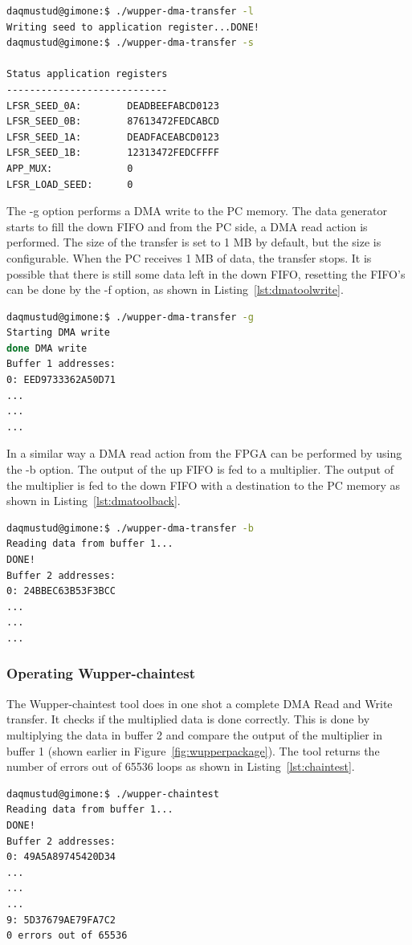 \begin{lstlisting}[language=BASH, frame=single, label={lst:dmatoolseed}, caption=Loading a pre-programmed seed in to the data generator.]
daqmustud@gimone:$ ./wupper-dma-transfer -l
Writing seed to application register...DONE! 
daqmustud@gimone:$ ./wupper-dma-transfer -s

Status application registers
----------------------------
LFSR_SEED_0A:        DEADBEEFABCD0123 
LFSR_SEED_0B:        87613472FEDCABCD 
LFSR_SEED_1A:        DEADFACEABCD0123 
LFSR_SEED_1B:        12313472FEDCFFFF 
APP_MUX:             0 
LFSR_LOAD_SEED:      0
\end{lstlisting}


The -g option performs a DMA write to the PC memory. The data generator starts to fill the down FIFO and from the PC side, a DMA read action is performed. The size of the transfer is set to 1 MB by default, but the size is configurable. When the PC receives 1 MB of data, the transfer stops. It is possible that there is still some data left in the down FIFO, resetting the FIFO's can be done by the -f option, as shown in Listing~\ref{lst:dmatoolwrite}.

\begin{lstlisting}[language=BASH, frame=single, label={lst:dmatoolwrite}, caption=Start generating data to the target.]
daqmustud@gimone:$ ./wupper-dma-transfer -g
Starting DMA write
done DMA write 
Buffer 1 addresses:
0: EED9733362A50D71 
...
...
...
\end{lstlisting}

\newpage

In a similar way a DMA read action from the FPGA can be performed by using the -b option. The output of the up FIFO is fed to a multiplier. The output of the multiplier is fed to the down FIFO with a destination to the PC memory as shown in Listing~\ref{lst:dmatoolback}.

\begin{lstlisting}[language=BASH, frame=single, label={lst:dmatoolback}, caption= Performing a DMA read and DMA write]
daqmustud@gimone:$ ./wupper-dma-transfer -b
Reading data from buffer 1...
DONE!
Buffer 2 addresses:
0: 24BBEC63B53F3BCC 
...
...
...
\end{lstlisting}

\subsubsection{Operating Wupper-chaintest}
The Wupper-chaintest tool does in one shot a complete DMA Read and Write transfer. It checks if the multiplied data is done correctly. This is done by multiplying the data in buffer 2 and compare the output of the multiplier in buffer 1 (shown earlier in Figure~\ref{fig:wupperpackage}). The tool returns the number of errors out of 65536 loops as shown in Listing~\ref{lst:chaintest}.
\begin{lstlisting}[language=BASH, frame=single, label={lst:chaintest}, caption=Output of Wupper-chaintest]
daqmustud@gimone:$ ./wupper-chaintest      
Reading data from buffer 1...
DONE!
Buffer 2 addresses:
0: 49A5A89745420D34 
...
...
... 
9: 5D37679AE79FA7C2 
0 errors out of 65536
\end{lstlisting}

